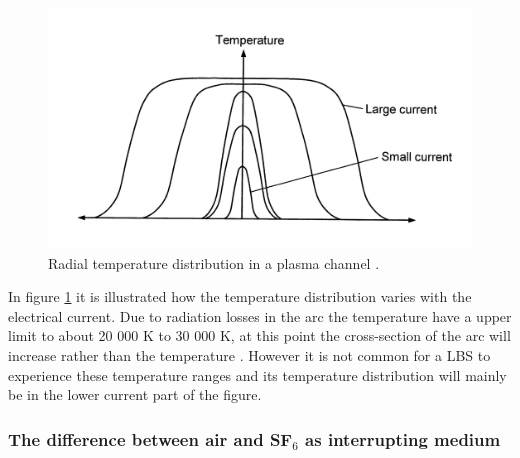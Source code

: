 \documentclass[10pt,a4paper]{article}
\begin{document}
\begin{figure}[H]
\centering
\includegraphics[scale=0.8]{Bilder/Theory/plasmaChannel1.png}
\caption{Radial temperature distribution in a plasma channel \cite{bib:HVEbreak}.} \label{fig:tempDist2}
\end{figure}

In figure \ref{fig:tempDist2} it is illustrated how the temperature distribution varies with the electrical current. Due to radiation losses in the arc the temperature have a upper limit to about 20 000 K to 30 000 K, at this point the cross-section of the arc will increase rather than the temperature \cite{bib:HVEbreak}. However it is not common for a LBS to experience these temperature ranges and its temperature distribution will mainly be in the lower current part of the figure.

\subsubsection{The difference between air and SF$_6$ as interrupting medium} \label{sec:airandsf}
\end{document}
